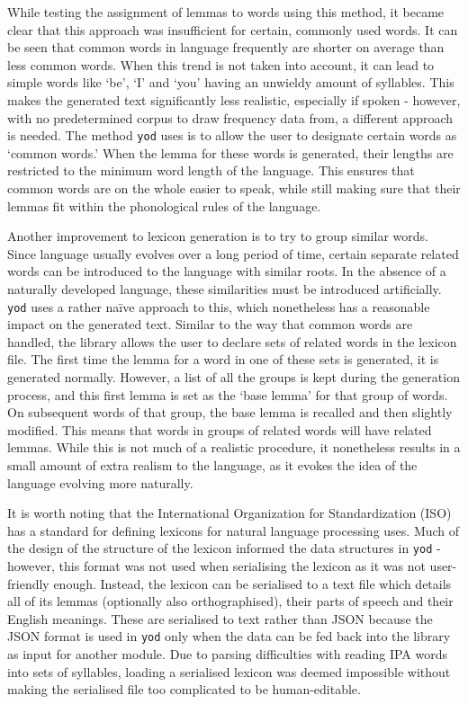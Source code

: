 \documentclass{report}
\begin{document}
	While testing the assignment of lemmas to words using this method, it became clear that this approach was insufficient for certain, commonly used words. It can be seen that common words in language frequently are shorter on average than less common words\cite{miller1958370}\cite{strauss2007word}. When this trend is not taken into account, it can lead to simple words like `be', `I' and `you' having an unwieldy amount of syllables. This makes the generated text significantly less realistic, especially if spoken - however, with no predetermined corpus to draw frequency data from, a different approach is needed. The method \texttt{yod} uses is to allow the user to designate certain words as `common words.' When the lemma for these words is generated, their lengths are restricted to the minimum word length of the language. This ensures that common words are on the whole easier to speak, while still making sure that their lemmas fit within the phonological rules of the language.
	
	Another improvement to lexicon generation is to try to group similar words. Since language usually evolves over a long period of time, certain separate related words can be introduced to the language with similar roots. In the absence of a naturally developed language, these similarities must be introduced artificially. \texttt{yod} uses a rather na\"ive approach to this, which nonetheless has a reasonable impact on the generated text. Similar to the way that common words are handled, the library allows the user to declare sets of related words in the lexicon file. The first time the lemma for a word in one of these sets is generated, it is generated normally. However, a list of all the groups is kept during the generation process, and this first lemma is set as the `base lemma' for that group of words. On subsequent words of that group, the base lemma is recalled and then slightly modified. This means that words in groups of related words will have related lemmas. While this is not much of a realistic procedure, it nonetheless results in a small amount of extra realism to the language, as it evokes the idea of the language evolving more naturally.
	
	It is worth noting that the International Organization for Standardization (ISO) has a standard for defining lexicons for natural language processing uses\cite{francopoulo2008language}. Much of the design of the structure of the lexicon informed the data structures in \texttt{yod} - however, this format was not used when serialising the lexicon as it was not user-friendly enough. Instead, the lexicon can be serialised to a text file which details all of its lemmas (optionally also orthographised), their parts of speech and their English meanings. These are serialised to text rather than JSON because the JSON format is used in \texttt{yod} only when the data can be fed back into the library as input for another module. Due to parsing difficulties with reading IPA words into sets of syllables, loading a serialised lexicon was deemed impossible without making the serialised file too complicated to be human-editable.
	
\end{document}
